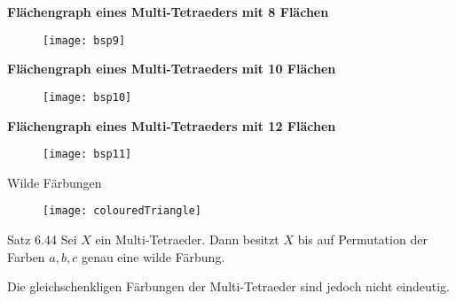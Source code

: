 \documentclass{beamer}
\begin{document}
\begin{frame}
\textbf{Flächengraph eines Multi-Tetraeders mit 8 Flächen}
\begin{figure}[H]
\begin{center}
\texttt{[image: bsp9]}
\end{center}

\end{figure}
\end{frame}
\begin{frame}

\textbf{Flächengraph eines Multi-Tetraeders mit 10 Flächen}
\begin{figure}[H]
\begin{center}
\texttt{[image: bsp10]}
\end{center}
\end{figure}
\end{frame}
\begin{frame}
\textbf{Flächengraph eines Multi-Tetraeders mit 12 Flächen}
\begin{figure}[H]
\begin{center}
\texttt{[image: bsp11]}
\end{center}
\end{figure}
\end{frame}
\begin{frame}
\begin{center}
\huge{Wilde Färbungen}
\end{center}
\end{frame}
\begin{figure}[H]
\begin{center}
\texttt{[image: colouredTriangle]}
\end{center}
\end{figure}
\begin{frame}
\begin{block}{Satz 6.44}
Sei $X$ ein Multi-Tetraeder. Dann besitzt $X$ bis auf Permutation der Farben $a,b,c$ genau eine wilde Färbung.
\end{block}
\end{frame}
\begin{frame}
Die gleichschenkligen Färbungen der Multi-Tetraeder sind jedoch nicht eindeutig.
\end{frame}
\end{document}
